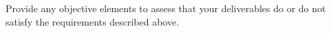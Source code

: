 {\color{gray}
Provide any objective elements to assess that your deliverables do or do not satisfy the requirements described above. 
}
